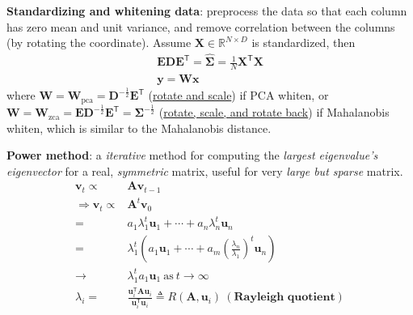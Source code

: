 \begin{example}
    \textbf{Standardizing and whitening data}: 
    preprocess the data so that each column has zero mean and unit variance, 
    and remove correlation between the columns (by rotating the coordinate).
    Assume $\mathbf{X}\in\mathbb{R}^{N\times D}$ is standardized,
    then 
    \begin{gather}
        \mathbf{EDE}^\mathsf{T}=\hat{\mathbf{\Sigma}}=\frac{1}{N}\mathbf{X}^\mathsf{T}\mathbf{X} \\
        \bm{y}=\mathbf{W}\bm{x}
    \end{gather}
    where $\mathbf{W}=\mathbf{W}_\text{pca}=\mathbf{D}^{-\frac{1}{2}}\mathbf{E}^\mathsf{T}$ (\uline{rotate and scale}) if PCA whiten, or
    $\mathbf{W}=\mathbf{W}_\text{zca}=\mathbf{E}\mathbf{D}^{-\frac{1}{2}}\mathbf{E}^\mathsf{T}=\mathbf{\Sigma}^{-\frac{1}{2}}$ (\uline{rotate, scale, and rotate back}) if Mahalanobis whiten,
    which is similar to the Mahalanobis distance.
\end{example}

\begin{example}
    \textbf{Power method}: a \textit{iterative} method for computing the \textit{largest eigenvalue's eigenvector} for a real, \textit{symmetric} matrix,
    useful for very \textit{large but sparse} matrix.
    \begin{align}
        \bm{v}_{t}\propto&\mathbf{A}\bm{v}_{t-1}\\
        \Rightarrow
        \bm{v}_{t}\propto&\mathbf{A}^t\bm{v}_0\\
        =& a_1\lambda_1^t\bm{u}_1+\cdots+a_n\lambda_n^t\bm{u}_n\\
        =& \lambda_1^t(a_1\bm{u}_1+\cdots+a_m(\frac{\lambda_n}{\lambda_1})^t\bm{u}_n)\\
        \to& \lambda_1^ta_1\bm{u}_1~\text{as}~t\to\infty\\
        \lambda_i=&\frac{\bm{u}_i^\mathsf{T}\mathbf{A}\bm{u}_i}{\bm{u}_i^\mathsf{T}\bm{u}_i}\triangleq R(\mathbf{A},\bm{u}_i)~(\textbf{Rayleigh quotient})
    \end{align}
\end{example}

